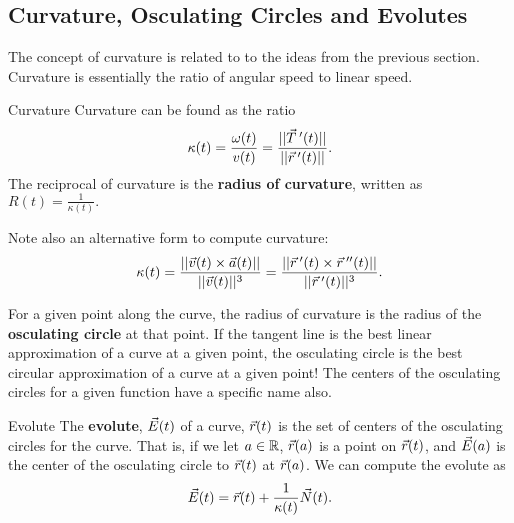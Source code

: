 \subsection{Curvature, Osculating Circles and Evolutes}
The concept of curvature is related to to the ideas from the previous section. Curvature is essentially the ratio of angular speed to linear speed.

\begin{definition}{Curvature}
Curvature can be found as the ratio $$\kappa(t)=\frac{\omega(t)}{v(t)}=\frac{||\vec{T}\hspace{0.2em}'(t)||}{||\vec{r}\hspace{0.2em}'(t)||}.$$
The reciprocal of curvature is the \textbf{radius of curvature}, written as $R(t)=\frac{1}{\kappa(t)}.$

\vspace{1em}
Note also an alternative form to compute curvature:
$$\kappa(t)=\frac{||\vec{v}(t)\times\vec{a}(t)||}{||\vec{v}(t) ||^3}= \frac{||\vec{r}\hspace{0.2em}'(t)\times\vec{r}\hspace{0.2em}''(t)||}{||\vec{r}\hspace{0.2em}'(t) ||^3}. $$
\end{definition}

For a given point along the curve, the radius of curvature is the radius of the \textbf{osculating circle} at that point. If the tangent line is the best linear approximation of a curve at a given point, the osculating circle is the best circular approximation of a curve at a given point! The centers of the osculating circles for a given function have a specific name also.

\begin{definition}{Evolute}
The \textbf{evolute}, $\vec{E}(t)$ of a curve, $\vec{r}(t)$ is the set of centers of the osculating circles for the curve. That is, if we let $a\in\mathbb{R}$, $\vec{r}(a)$ is a point on $\vec{r}(t)$, and $\vec{E}(a)$ is the center of the osculating circle to $\vec{r}(t)$ at $\vec{r}(a)$. We can compute the evolute as
$$\vec{E}(t)=\vec{r}(t)+\frac{1}{\kappa(t)}\vec{N}(t).$$
\end{definition}

